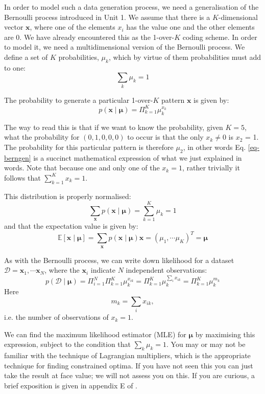 In order to model such a data generation process, we need a generalisation of the Bernoulli process introduced in Unit 1. We assume that there is a $K$-dimensional
vector $\boldsymbol{x}$, where one of the elements $x_{i}$ has the value one and the other elements are 0. We have already encountered this as the 1-over-$K$ coding
scheme. In order to model it, we need a multidimensional version of the Bernoulli process. We define a set of $K$ probabilities, $\mu_k$, which by virtue of them probabilities
must add to one:
$$
\sum_k \mu_k = 1
$$

The probability to generate a particular 1-over-$K$ pattern $\boldsymbol{x}$ is given by:
\begin{equation}
  p(\boldsymbol{x} \mid \boldsymbol{\mu} ) = \Pi^K_{k=1} \mu^{x_k}_k
  \label{eq-berngen}
\end{equation}

The way to read this is that if we want to know the probability, given $K=5$, what the probability for $(0,1,0,0,0)$ to occur is
that the only $x_k \ne 0$ is $x_2$ = 1. The probability for this particular pattern is therefore $\mu_2$, in other words Eq. \ref{eq-berngen}
is a succinct mathematical expression of what we just explained in words. Note that because one and only one of the $x_k =1$, rather trivially it follows
that $\sum^K_{k=1} x_k = 1$.

This distribution is properly normalised:
$$
\sum_{\boldsymbol{x}} p( \boldsymbol{x} \mid \boldsymbol{\mu} ) = \sum^K_{k=1} \mu_k = 1
$$
and that the expectation value is given by:
$$
\mathbb{E}[ \boldsymbol{x} \mid \boldsymbol{\mu} ] = \sum_{\boldsymbol{x}} p(\boldsymbol{x} \mid \boldsymbol{\mu}) \boldsymbol{x} = (\mu_1, \cdots \mu_K)^T = \boldsymbol{\mu}
$$

As with the Bernoulli process, we can write down  likelihood for a dataset $\mathcal{D} = \boldsymbol{x}_1, \cdots \boldsymbol{x}_N$, where the $\boldsymbol{x}_i$ indicate
$N$ independent observations:
$$
p(  \mathcal{D} \mid \boldsymbol{\mu} ) = \Pi^N_{i=1} \Pi^K_{k=1} \mu^{x_{ik}}_k = \Pi^K_{k=1} \mu^{\sum_i x_{ik}}_k = \Pi^K_{k=1} \mu^{m_k}_k
$$
Here
$$
m_k = \sum_i x_{ik},
$$
i.e. the number of observations of $x_k = 1$.

We can find the maximum likelihood estimator (MLE) for $\boldsymbol{\mu}$ by maximising this expression, subject to the condition that $\sum_k \mu_k = 1$. You may
or may not be familiar with the technique of Lagrangian multipliers, which is the appropriate technique for finding constrained optima. If you have not seen this
you can just take the result at face value; we will not assess you on this. If you are curious, a brief exposition is given in appendix E of \cite{bishop2006}.

